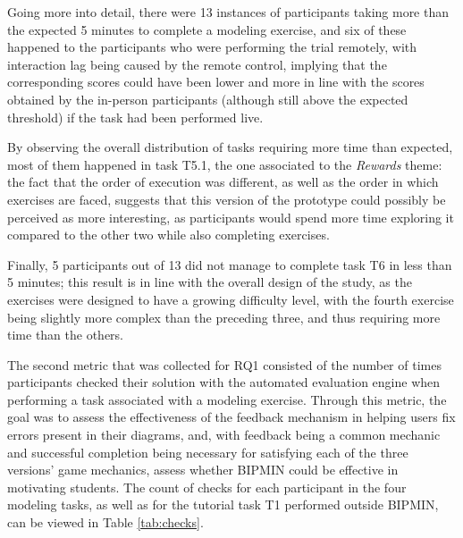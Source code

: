 Going more into detail, there were 13 instances of participants taking more than the expected 5 minutes to complete a modeling exercise, and six of these happened to the participants who were performing the trial remotely, with interaction lag being caused by the remote control, implying that the corresponding scores could have been lower and more in line with the scores obtained by the in-person participants (although still above the expected threshold) if the task had been performed live.

By observing the overall distribution of tasks requiring more time than expected, most of them happened in task T5.1, the one associated to the \textit{Rewards} theme: the fact that the order of execution was different, as well as the order in which exercises are faced, suggests that this version of the prototype could possibly be perceived as more interesting, as participants would spend more time exploring it compared to the other two while also completing exercises.

Finally, 5 participants out of 13 did not manage to complete task T6 in less than 5 minutes; this result is in line with the overall design of the study, as the exercises were designed to have a growing difficulty level, with the fourth exercise being slightly more complex than the preceding three, and thus requiring more time than the others.

The second metric that was collected for RQ1 consisted of the number of times participants checked their solution with the automated evaluation engine when performing a task associated with a modeling exercise. Through this metric, the goal was to assess the effectiveness of the feedback mechanism in helping users fix errors present in their diagrams, and, with feedback being a common mechanic and successful completion being necessary for satisfying each of the three versions' game mechanics, assess whether BIPMIN could be effective in motivating students. The count of checks for each participant in the four modeling tasks, as well as for the tutorial task T1 performed outside BIPMIN, can be viewed in Table \ref{tab:checks}.

